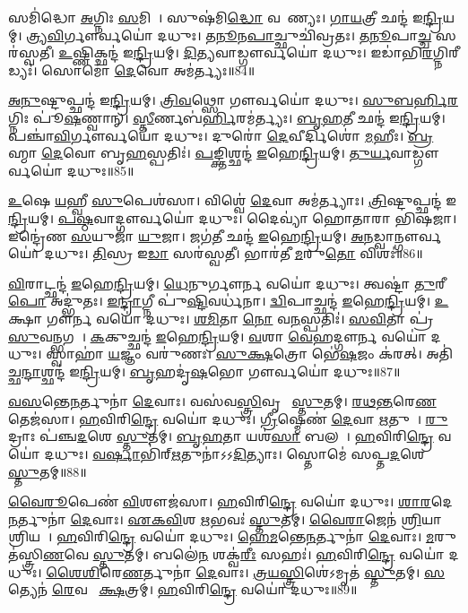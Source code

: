 𑌸𑌮𑌿॑𑌦𑍍𑌧𑍋 \ul{𑌅}𑌗𑍍𑌨𑌿𑌃 \ul{𑌸}𑌮𑌿𑌧𑌾᳚।
𑌸𑍁𑌷॑𑌮𑌿\ul{𑌦𑍍𑌧𑍋} 𑌵𑌰𑍇᳚𑌣𑍍𑌯𑌃।
\ul{𑌗𑌾}\ul{𑌯}𑌤𑍍𑌰𑍀 𑌛𑌨𑍍𑌦॑ 𑌇\ul{𑌨𑍍𑌦𑍍𑌰𑌿}𑌯𑌮𑍍।
𑌤𑍍𑌰𑍍𑌯\ul{𑌵𑌿}𑌰𑍍𑌗𑍗𑌰𑍍𑌵𑌯𑍋॑ 𑌦𑌧𑍁𑌃।
𑌤\ul{𑌨𑍂}𑌨\ul{𑌪𑌾}𑌚𑍍𑌛𑍁𑌚𑌿॑𑌵𑍍𑌰𑌤𑌃।
\ul{𑌤}\ul{𑌨𑍂}𑌪𑌾\ul{𑌚𑍍𑌚} 𑌸𑌰॑𑌸𑍍𑌵𑌤𑍀।
\ul{𑌉}𑌷𑍍𑌣𑌿𑌕𑍍𑌛𑌨𑍍𑌦॑ 𑌇\ul{𑌨𑍍𑌦𑍍𑌰𑌿}𑌯𑌮𑍍।
\ul{𑌦𑌿}\ul{𑌤𑍍𑌯}𑌵𑌾𑌡𑍍𑌗𑍗𑌰𑍍𑌵𑌯𑍋॑ 𑌦𑌧𑍁𑌃।
𑌇𑌡𑌾॑𑌭𑌿\ul{𑌰}𑌗𑍍𑌨𑌿𑌰𑍀𑌡𑍍𑌯𑌃॑।
𑌸𑍋𑌮𑍋॑ \ul{𑌦𑍇}𑌵𑍋 𑌅𑌮॑𑌰𑍍𑌤𑍍𑌯𑌃॥84॥

\ul{𑌅}\ul{𑌨𑍁}𑌷𑍍𑌟𑍁𑌪𑍍𑌛𑌨𑍍𑌦॑ 𑌇\ul{𑌨𑍍𑌦𑍍𑌰𑌿}𑌯𑌮𑍍।
\ul{𑌤𑍍𑌰𑌿}\ul{𑌵}𑌥𑍍𑌸𑍋 𑌗𑍗𑌰𑍍𑌵𑌯𑍋॑ 𑌦𑌧𑍁𑌃।
\ul{𑌸𑍁}\ul{𑌬}\ul{𑌰𑍍}𑌹𑌿\ul{𑌰}𑌗𑍍𑌨𑌿𑌃 𑌪𑍂॑\ul{𑌷}𑌣𑍍𑌵𑌾𑌨𑍍।
\ul{𑌸𑍍𑌤𑍀}𑌰𑍍𑌣𑌬॑\ul{𑌰𑍍𑌹𑌿}𑌰𑌮॑𑌰𑍍𑌤𑍍𑌯𑌃।
\ul{𑌬𑍃}\ul{𑌹}𑌤𑍀 𑌛𑌨𑍍𑌦॑ 𑌇\ul{𑌨𑍍𑌦𑍍𑌰𑌿}𑌯𑌮𑍍।
𑌪𑌞𑍍𑌚𑌾॑\ul{𑌵𑌿}𑌰𑍍𑌗𑍗𑌰𑍍𑌵𑌯𑍋॑ 𑌦𑌧𑍁𑌃।
𑌦𑍁𑌰𑍋॑ \ul{𑌦𑍇}𑌵𑍀𑌰𑍍𑌦𑌿𑌶𑍋॑ \ul{𑌮}𑌹𑍀𑌃।
\ul{𑌬𑍍𑌰}𑌹𑍍𑌮𑌾 \ul{𑌦𑍇}𑌵𑍋 𑌬𑍃\ul{𑌹}𑌸𑍍𑌪𑌤𑌿𑌃॑।
\ul{𑌪}𑌙𑍍𑌕𑍍𑌤𑌿𑌶𑍍𑌛𑌨𑍍𑌦॑ \ul{𑌇}𑌹𑍇\ul{𑌨𑍍𑌦𑍍𑌰𑌿}𑌯𑌮𑍍।
\ul{𑌤𑍁}\ul{𑌰𑍍𑌯}𑌵𑌾𑌡𑍍𑌗𑍗𑌰𑍍𑌵𑌯𑍋॑ 𑌦𑌧𑍁𑌃॥85॥

\ul{𑌉}𑌷𑍇 \ul{𑌯}𑌹𑍍𑌵𑍀 \ul{𑌸𑍁}𑌪𑍇𑌶॑𑌸𑌾।
𑌵𑌿𑌶𑍍𑌵𑍇॑ \ul{𑌦𑍇}𑌵𑌾 𑌅𑌮॑𑌰𑍍𑌤𑍍𑌯𑌾𑌃।
\ul{𑌤𑍍𑌰𑌿}𑌷𑍍𑌟𑍁𑌪𑍍𑌛𑌨𑍍𑌦॑ 𑌇\ul{𑌨𑍍𑌦𑍍𑌰𑌿}𑌯𑌮𑍍।
\ul{𑌪}\ul{𑌷𑍍𑌠}𑌵𑌾𑌦𑍍𑌗𑍗𑌰𑍍𑌵𑌯𑍋॑ 𑌦𑌧𑍁𑌃।
𑌦𑍈𑌵𑍍𑌯𑌾॑ 𑌹𑍋𑌤𑌾𑌰𑌾 𑌭𑌿𑌷𑌜𑌾।
𑌇𑌨𑍍𑌦𑍍𑌰𑍇॑𑌣 \ul{𑌸}𑌯𑍁𑌜𑌾॑ \ul{𑌯𑍁}𑌜𑌾।
𑌜𑌗॑\ul{𑌤𑍀} 𑌛𑌨𑍍𑌦॑ \ul{𑌇}𑌹𑍇\ul{𑌨𑍍𑌦𑍍𑌰𑌿}𑌯𑌮𑍍।
\ul{𑌅}\ul{𑌨}𑌡𑍍𑌵𑌾𑌨𑍍𑌗𑍗𑌰𑍍𑌵𑌯𑍋॑ 𑌦𑌧𑍁𑌃।
\ul{𑌤𑌿}𑌸𑍍𑌰 𑌇\ul{𑌡𑌾} 𑌸𑌰॑𑌸𑍍𑌵𑌤𑍀।
𑌭𑌾𑌰॑𑌤𑍀 \ul{𑌮}𑌰𑍁\ul{𑌤𑍋} 𑌵𑌿𑌶𑌃॑॥86॥

\ul{𑌵𑌿}𑌰𑌾𑌟𑍍𑌛𑌨𑍍𑌦॑ \ul{𑌇}𑌹𑍇\ul{𑌨𑍍𑌦𑍍𑌰𑌿}𑌯𑌮𑍍।
\ul{𑌧𑍇}𑌨𑍁𑌰𑍍𑌗𑍗𑌰𑍍𑌨 𑌵𑌯𑍋॑ 𑌦𑌧𑍁𑌃।
𑌤𑍍𑌵𑌷𑍍𑌟𑌾॑ \ul{𑌤𑍁}𑌰𑍀\ul{𑌪𑍋} 𑌅𑌦𑍍𑌭𑍁॑𑌤𑌃।
\ul{𑌇}\ul{𑌨𑍍𑌦𑍍𑌰𑌾}𑌗𑍍𑌨𑍀 𑌪𑍁॑\ul{𑌷𑍍𑌟𑌿}𑌵𑌰𑍍𑌧॑𑌨𑌾।
\ul{𑌦𑍍𑌵𑌿}𑌪𑌾𑌚𑍍𑌛𑌨𑍍𑌦॑ \ul{𑌇}𑌹𑍇\ul{𑌨𑍍𑌦𑍍𑌰𑌿}𑌯𑌮𑍍।
\ul{𑌉}𑌕𑍍𑌷𑌾 𑌗𑍗𑌰𑍍𑌨 𑌵𑌯𑍋॑ 𑌦𑌧𑍁𑌃।
\ul{𑌶}\ul{𑌮𑌿}𑌤𑌾 \ul{𑌨𑍋} 𑌵\ul{𑌨}𑌸𑍍𑌪𑌤𑌿𑌃॑।
\ul{𑌸}\ul{𑌵𑌿}𑌤𑌾 𑌪𑍍𑌰॑\ul{𑌸𑍁}𑌵𑌨𑍍𑌭𑌗𑌮𑍍᳚।
\ul{𑌕}𑌕𑍁𑌚𑍍𑌛𑌨𑍍𑌦॑ \ul{𑌇}𑌹𑍇\ul{𑌨𑍍𑌦𑍍𑌰𑌿}𑌯𑌮𑍍।
\ul{𑌵}𑌶𑌾 \ul{𑌵𑍇}𑌹𑌦𑍍𑌗𑍗𑌰𑍍𑌨 𑌵𑌯𑍋॑ 𑌦𑌧𑍁𑌃।
𑌸𑍍𑌵𑌾𑌹𑌾॑ \ul{𑌯}𑌜𑍍𑌞𑌂 𑌵𑌰𑍁॑𑌣𑌃।
\ul{𑌸𑍁}\ul{𑌕𑍍𑌷}𑌤𑍍𑌰𑍋 𑌭𑍇॑\ul{𑌷}𑌜𑌂 𑌕॑𑌰𑌤𑍍।
𑌅𑌤𑌿॑𑌚𑍍𑌛\ul{𑌨𑍍𑌦𑌾}𑌶𑍍𑌛𑌨𑍍𑌦॑ 𑌇\ul{𑌨𑍍𑌦𑍍𑌰𑌿}𑌯𑌮𑍍।
\ul{𑌬𑍃}𑌹𑌦𑍃॑\ul{𑌷}𑌭𑍋 𑌗𑍗𑌰𑍍𑌵𑌯𑍋॑ 𑌦𑌧𑍁𑌃॥87॥\anuvakamend[𑌅𑌮॑𑌰𑍍𑌤𑍍𑌯𑌸𑍍𑌤𑍁\ul{𑌰𑍍𑌯}𑌵𑌾𑌡𑍍𑌗𑍗𑌰𑍍𑌵𑌯𑍋॑ 𑌦\ul{𑌧𑍁}𑌰𑍍𑌵𑌿𑌶𑍋॑ \ul{𑌵}𑌶𑌾 \ul{𑌵𑍇}𑌹𑌦𑍍𑌗𑍗𑌰𑍍𑌨 𑌵𑌯𑍋॑ 𑌦𑌧𑍁\ul{𑌶𑍍𑌚}𑌤𑍍𑌵𑌾𑌰𑌿॑ 𑌚]

\ul{𑌵}\ul{𑌸}𑌨𑍍𑌤𑍇\ul{𑌨}𑌰𑍍𑌤𑍁𑌨𑌾॑ \ul{𑌦𑍇}𑌵𑌾𑌃।
𑌵𑌸॑𑌵\ul{𑌸𑍍𑌤𑍍𑌰𑌿}𑌵𑍃𑌤𑌾᳚ \ul{𑌸𑍍𑌤𑍁}𑌤𑌮𑍍।
\ul{𑌰}\ul{𑌥}\ul{𑌨𑍍𑌤}𑌰𑍇\ul{𑌣} 𑌤𑍇𑌜॑𑌸𑌾।
\ul{𑌹}𑌵𑌿𑌰𑌿\ul{𑌨𑍍𑌦𑍍𑌰𑍇} 𑌵𑌯𑍋॑ 𑌦𑌧𑍁𑌃।
\ul{𑌗𑍍𑌰𑍀}𑌷𑍍𑌮𑍇𑌣॑ \ul{𑌦𑍇}𑌵𑌾 \ul{𑌋}𑌤𑍁𑌨𑌾᳚।
\ul{𑌰𑍁}𑌦𑍍𑌰𑌾𑌃 𑌪॑𑌞𑍍𑌚\ul{𑌦}𑌶𑍇 \ul{𑌸𑍍𑌤𑍁}𑌤𑌮𑍍।
\ul{𑌬𑍃}\ul{𑌹}𑌤𑌾 𑌯𑌶॑\ul{𑌸𑌾} 𑌬𑌲𑌮𑍍᳚।
\ul{𑌹}𑌵𑌿𑌰𑌿\ul{𑌨𑍍𑌦𑍍𑌰𑍇} 𑌵𑌯𑍋॑ 𑌦𑌧𑍁𑌃।
\ul{𑌵}\ul{𑌰𑍍}𑌷𑌾𑌭𑌿॑𑌰𑍍\mbox{}\ul{𑌋}𑌤𑍁𑌨𑌾॑\-𑌽𑌽\ul{𑌦𑌿}𑌤𑍍𑌯𑌾𑌃।
𑌸𑍍𑌤𑍋𑌮𑍇॑ 𑌸𑌪𑍍𑌤\ul{𑌦}𑌶𑍇 \ul{𑌸𑍍𑌤𑍁}𑌤𑌮𑍍॥88॥

\ul{𑌵𑍈}\ul{𑌰𑍂}𑌪𑍇𑌣॑ \ul{𑌵𑌿}𑌶𑍗𑌜॑𑌸𑌾।
\ul{𑌹}𑌵𑌿𑌰𑌿\ul{𑌨𑍍𑌦𑍍𑌰𑍇} 𑌵𑌯𑍋॑ 𑌦𑌧𑍁𑌃।
\ul{𑌶𑌾}\ul{𑌰}𑌦𑍇\ul{𑌨}𑌰𑍍𑌤𑍁𑌨𑌾॑ \ul{𑌦𑍇}𑌵𑌾𑌃।
\ul{𑌏}\ul{𑌕}\ul{𑌵𑌿}\ul{}𑌶 \ul{𑌋}𑌭𑌵𑌃॑ \ul{𑌸𑍍𑌤𑍁}𑌤𑌮𑍍।
\ul{𑌵𑍈}\ul{𑌰𑌾}𑌜𑍇𑌨॑ \ul{𑌶𑍍𑌰𑌿}𑌯𑌾 𑌶𑍍𑌰𑌿𑌯𑌮𑍍᳚।
\ul{𑌹}𑌵𑌿𑌰𑌿\ul{𑌨𑍍𑌦𑍍𑌰𑍇} 𑌵𑌯𑍋॑ 𑌦𑌧𑍁𑌃।
\ul{𑌹𑍇}\ul{𑌮}𑌨𑍍𑌤𑍇\ul{𑌨}𑌰𑍍𑌤𑍁𑌨𑌾॑ \ul{𑌦𑍇}𑌵𑌾𑌃।
\ul{𑌮}𑌰𑍁𑌤॑𑌸𑍍𑌤𑍍𑌰𑌿\ul{𑌣}𑌵𑍇 \ul{𑌸𑍍𑌤𑍁}𑌤𑌮𑍍।
𑌬𑌲𑍇॑\ul{𑌨} 𑌶𑌕𑍍𑌵॑\ul{𑌰𑍀𑌃} 𑌸𑌹𑌃॑।
\ul{𑌹}𑌵𑌿𑌰𑌿\ul{𑌨𑍍𑌦𑍍𑌰𑍇} 𑌵𑌯𑍋॑ 𑌦𑌧𑍁𑌃।
\ul{𑌶𑍈}\ul{𑌶𑌿}𑌰𑍇\ul{𑌣}𑌰𑍍𑌤𑍁𑌨𑌾॑ \ul{𑌦𑍇}𑌵𑌾𑌃।
\ul{𑌤𑍍𑌰}\ul{𑌯}\ul{𑌸𑍍𑌤𑍍𑌰𑌿}\ul{}𑌶𑍇॑\-𑌽𑌮𑍃𑌤॑ \ul{𑌸𑍍𑌤𑍁}𑌤𑌮𑍍।
\ul{𑌸}𑌤𑍍𑌯𑍇𑌨॑ \ul{𑌰𑍇}𑌵𑌤𑍀𑌃᳚ \ul{𑌕𑍍𑌷}𑌤𑍍𑌰𑌮𑍍।
\ul{𑌹}𑌵𑌿𑌰𑌿\ul{𑌨𑍍𑌦𑍍𑌰𑍇} 𑌵𑌯𑍋॑ 𑌦𑌧𑍁𑌃॥89॥

